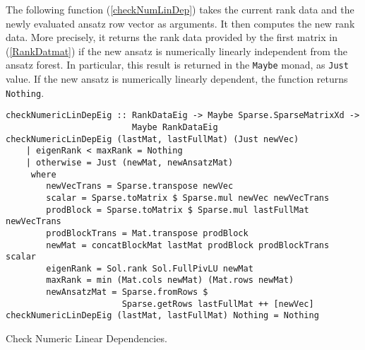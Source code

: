 The following function (\ref{checkNumLinDep}) takes the current rank data and the newly evaluated ansatz row vector as arguments. It then computes the new rank data. More precisely, it returns the rank data provided by the first matrix in (\ref{RankDatmat}) if the new ansatz is numerically linearly independent from the ansatz forest. In particular, this result is returned in the \texttt{Maybe} monad, as \texttt{Just} value. If the new ansatz is numerically linearly dependent, the function returns \texttt{Nothing}.

\begin{listing}[hbt!]
\begin{verbatim}
checkNumericLinDepEig :: RankDataEig -> Maybe Sparse.SparseMatrixXd ->
                         Maybe RankDataEig
checkNumericLinDepEig (lastMat, lastFullMat) (Just newVec)
    | eigenRank < maxRank = Nothing
    | otherwise = Just (newMat, newAnsatzMat)
     where
        newVecTrans = Sparse.transpose newVec
        scalar = Sparse.toMatrix $ Sparse.mul newVec newVecTrans
        prodBlock = Sparse.toMatrix $ Sparse.mul lastFullMat newVecTrans
        prodBlockTrans = Mat.transpose prodBlock
        newMat = concatBlockMat lastMat prodBlock prodBlockTrans scalar
        eigenRank = Sol.rank Sol.FullPivLU newMat
        maxRank = min (Mat.cols newMat) (Mat.rows newMat)
        newAnsatzMat = Sparse.fromRows $ 
                       Sparse.getRows lastFullMat ++ [newVec]
checkNumericLinDepEig (lastMat, lastFullMat) Nothing = Nothing
\end{verbatim} 
\caption{Check Numeric Linear Dependencies.}\label{checkNumLinDep}
\end{listing}


